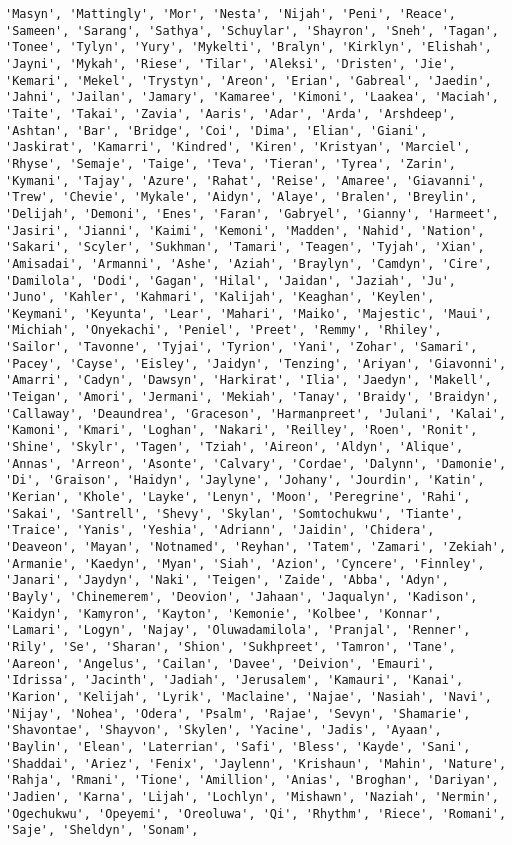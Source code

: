 \documentclass[11pt]{article}
\begin{document}
\begin{Verbatim}[commandchars=\\\{\}]
'Masyn', 'Mattingly', 'Mor', 'Nesta', 'Nijah', 'Peni', 'Reace', 'Sameen', 'Sarang', 'Sathya', 'Schuylar', 'Shayron', 'Sneh', 'Tagan', 'Tonee', 'Tylyn', 'Yury', 'Mykelti', 'Bralyn', 'Kirklyn', 'Elishah', 'Jayni', 'Mykah', 'Riese', 'Tilar', 'Aleksi', 'Dristen', 'Jie', 'Kemari', 'Mekel', 'Trystyn', 'Areon', 'Erian', 'Gabreal', 'Jaedin', 'Jahni', 'Jailan', 'Jamary', 'Kamaree', 'Kimoni', 'Laakea', 'Maciah', 'Taite', 'Takai', 'Zavia', 'Aaris', 'Adar', 'Arda', 'Arshdeep', 'Ashtan', 'Bar', 'Bridge', 'Coi', 'Dima', 'Elian', 'Giani', 'Jaskirat', 'Kamarri', 'Kindred', 'Kiren', 'Kristyan', 'Marciel', 'Rhyse', 'Semaje', 'Taige', 'Teva', 'Tieran', 'Tyrea', 'Zarin', 'Kymani', 'Tajay', 'Azure', 'Rahat', 'Reise', 'Amaree', 'Giavanni', 'Trew', 'Chevie', 'Mykale', 'Aidyn', 'Alaye', 'Bralen', 'Breylin', 'Delijah', 'Demoni', 'Enes', 'Faran', 'Gabryel', 'Gianny', 'Harmeet', 'Jasiri', 'Jianni', 'Kaimi', 'Kemoni', 'Madden', 'Nahid', 'Nation', 'Sakari', 'Scyler', 'Sukhman', 'Tamari', 'Teagen', 'Tyjah', 'Xian', 'Amisadai', 'Armanni', 'Ashe', 'Aziah', 'Braylyn', 'Camdyn', 'Cire', 'Damilola', 'Dodi', 'Gagan', 'Hilal', 'Jaidan', 'Jaziah', 'Ju', 'Juno', 'Kahler', 'Kahmari', 'Kalijah', 'Keaghan', 'Keylen', 'Keymani', 'Keyunta', 'Lear', 'Mahari', 'Maiko', 'Majestic', 'Maui', 'Michiah', 'Onyekachi', 'Peniel', 'Preet', 'Remmy', 'Rhiley', 'Sailor', 'Tavonne', 'Tyjai', 'Tyrion', 'Yani', 'Zohar', 'Samari', 'Pacey', 'Cayse', 'Eisley', 'Jaidyn', 'Tenzing', 'Ariyan', 'Giavonni', 'Amarri', 'Cadyn', 'Dawsyn', 'Harkirat', 'Ilia', 'Jaedyn', 'Makell', 'Teigan', 'Amori', 'Jermani', 'Mekiah', 'Tanay', 'Braidy', 'Braidyn', 'Callaway', 'Deaundrea', 'Graceson', 'Harmanpreet', 'Julani', 'Kalai', 'Kamoni', 'Kmari', 'Loghan', 'Nakari', 'Reilley', 'Roen', 'Ronit', 'Shine', 'Skylr', 'Tagen', 'Tziah', 'Aireon', 'Aldyn', 'Alique', 'Annas', 'Arreon', 'Asonte', 'Calvary', 'Cordae', 'Dalynn', 'Damonie', 'Di', 'Graison', 'Haidyn', 'Jaylyne', 'Johany', 'Jourdin', 'Katin', 'Kerian', 'Khole', 'Layke', 'Lenyn', 'Moon', 'Peregrine', 'Rahi', 'Sakai', 'Santrell', 'Shevy', 'Skylan', 'Somtochukwu', 'Tiante', 'Traice', 'Yanis', 'Yeshia', 'Adriann', 'Jaidin', 'Chidera', 'Deaveon', 'Mayan', 'Notnamed', 'Reyhan', 'Tatem', 'Zamari', 'Zekiah', 'Armanie', 'Kaedyn', 'Myan', 'Siah', 'Azion', 'Cyncere', 'Finnley', 'Janari', 'Jaydyn', 'Naki', 'Teigen', 'Zaide', 'Abba', 'Adyn', 'Bayly', 'Chinemerem', 'Deovion', 'Jahaan', 'Jaqualyn', 'Kadison', 'Kaidyn', 'Kamyron', 'Kayton', 'Kemonie', 'Kolbee', 'Konnar', 'Lamari', 'Logyn', 'Najay', 'Oluwadamilola', 'Pranjal', 'Renner', 'Rily', 'Se', 'Sharan', 'Shion', 'Sukhpreet', 'Tamron', 'Tane', 'Aareon', 'Angelus', 'Cailan', 'Davee', 'Deivion', 'Emauri', 'Idrissa', 'Jacinth', 'Jadiah', 'Jerusalem', 'Kamauri', 'Kanai', 'Karion', 'Kelijah', 'Lyrik', 'Maclaine', 'Najae', 'Nasiah', 'Navi', 'Nijay', 'Nohea', 'Odera', 'Psalm', 'Rajae', 'Sevyn', 'Shamarie', 'Shavontae', 'Shayvon', 'Skylen', 'Yacine', 'Jadis', 'Ayaan', 'Baylin', 'Elean', 'Laterrian', 'Safi', 'Bless', 'Kayde', 'Sani', 'Shaddai', 'Ariez', 'Fenix', 'Jaylenn', 'Krishaun', 'Mahin', 'Nature', 'Rahja', 'Rmani', 'Tione', 'Amillion', 'Anias', 'Broghan', 'Dariyan', 'Jadien', 'Karna', 'Lijah', 'Lochlyn', 'Mishawn', 'Naziah', 'Nermin', 'Ogechukwu', 'Opeyemi', 'Oreoluwa', 'Qi', 'Rhythm', 'Riece', 'Romani', 'Saje', 'Sheldyn', 'Sonam', 
\end{Verbatim}
\end{document}
